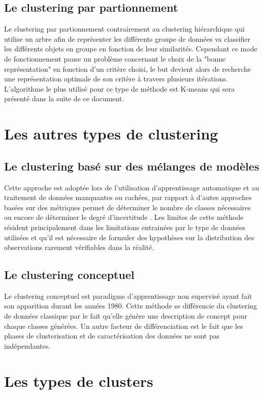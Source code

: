 \documentclass[memoire.tex]{subfiles}
\begin{document}
\newpage
\subsection{Le clustering par partionnement}
Le clustering par partionnement contrairement au clustering hiérarchique qui utilise un arbre afin de représenter les différents groupe de données va classifier les différents objets en groupe en fonction de leur similarités. Cependant ce mode de fonctionnement pause un problème concernant le choix de la "bonne représentation" en fonction d'un critère choisi, le but devient alors de recherche une représentation optimale de son critère à travers plusieurs itérations.\cite{ref8} L'algorithme le plus utilisé pour ce type de méthode est K-means qui sera présenté dans la suite de ce document.

 
\section{Les autres types de clustering}
\subsection{Le clustering basé sur des mélanges de modèles}
Cette approche est adoptée lors de l'utilisation d'apprentissage automatique et au traitement de données manquantes ou cachées, par rapport à d'autes approches basées sur des métriques permet de déterminer le nombre de classes nécessaires  ou encore de déterminer le degré d'incertitude \cite{ref10}. Les limites de cette méthode résident principalement dans les limitations entrainées par le type de données utilisées et qu'il est nécessaire de formuler des hypothèses sur la distribution des observations rarement vérifiables dans la réalité.\cite{ref8}

\subsection{Le clustering conceptuel}
Le clustering conceptuel est paradigme d'apprentissage non supervisé ayant fait son apparition durant les années 1980. Cette méthode se différencie du clustering de données classique par le fait qu'elle génère une description de concept pour chaque classes générées. Un autre facteur de différenciation est le fait que les phases de clusterisation et de caractérisation des données ne sont pas indépendantes.\cite{ref11}


\section{Les types de clusters}
\end{document}
